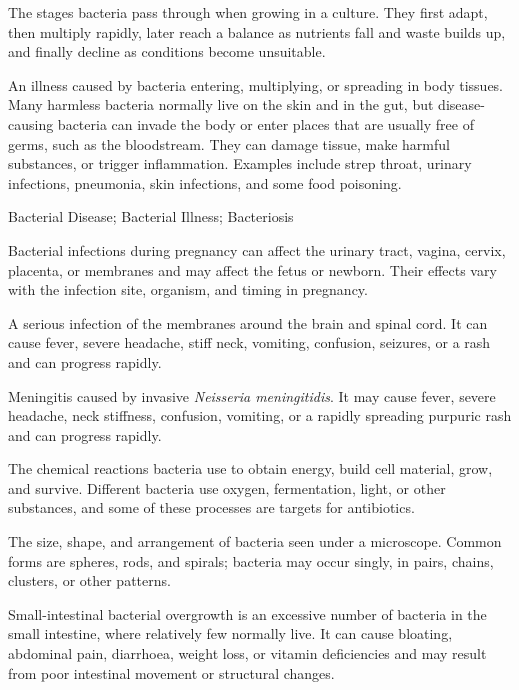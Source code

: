  The stages bacteria pass through when growing in a culture. They first adapt, then multiply rapidly, later reach a balance as nutrients fall and waste builds up, and finally decline as conditions become unsuitable.

 An illness caused by bacteria entering,
multiplying, or spreading in body tissues. Many harmless bacteria normally live
on the skin and in the gut, but disease-causing bacteria can invade the body or
enter places that are usually free of germs, such as the bloodstream. They can
damage tissue, make harmful substances, or trigger inflammation. Examples
include strep throat, urinary infections, pneumonia, skin infections, and some
food poisoning.

\synonyms
Bacterial Disease; Bacterial Illness; Bacteriosis

 Bacterial infections during pregnancy can affect the urinary tract, vagina, cervix, placenta, or membranes and may affect the fetus or newborn. Their effects vary with the infection site, organism, and timing in pregnancy.

 A serious infection of the membranes around the brain and spinal cord. It can cause fever, severe headache, stiff neck, vomiting, confusion, seizures, or a rash and can progress rapidly.

 Meningitis caused by invasive \textit{Neisseria meningitidis}. It may cause fever, severe headache, neck stiffness, confusion, vomiting, or a rapidly spreading purpuric rash and can progress rapidly.

 The chemical reactions bacteria use to obtain energy, build cell material, grow, and survive. Different bacteria use oxygen, fermentation, light, or other substances, and some of these processes are targets for antibiotics.

 The size, shape, and arrangement of bacteria seen under a microscope. Common forms are spheres, rods, and spirals; bacteria may occur singly, in pairs, chains, clusters, or other patterns.

 Small-intestinal bacterial overgrowth is an excessive number of bacteria in the small intestine, where relatively few normally live. It can cause bloating, abdominal pain, diarrhoea, weight loss, or vitamin deficiencies and may result from poor intestinal movement or structural changes.

